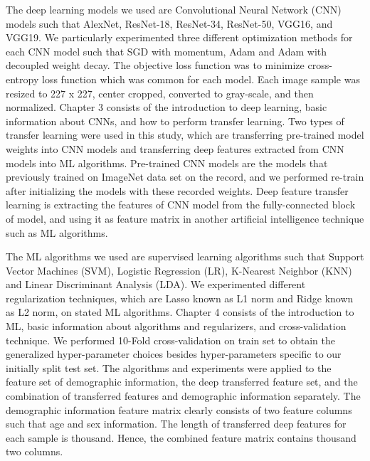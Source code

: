 The deep learning models we used are Convolutional Neural Network (CNN) models such that AlexNet, ResNet-18, ResNet-34, ResNet-50, VGG16, and VGG19. We particularly experimented three different optimization methods for each CNN model such that SGD with momentum, Adam and Adam with decoupled weight decay. The objective loss function was to minimize cross-entropy loss function which was common for each model. Each image sample was resized to 227 x 227, center cropped, converted to gray-scale, and then normalized. Chapter 3 consists of the introduction to deep learning, basic information about CNNs, and how to perform transfer learning. Two types of transfer learning were used in this study, which are transferring pre-trained model weights into CNN models and transferring deep features extracted from CNN models into ML algorithms. Pre-trained CNN models are the models that previously trained on ImageNet data set on the record, and we performed re-train after initializing the models with these recorded weights. Deep feature transfer learning is extracting the features of CNN model from the fully-connected block of model, and using it as feature matrix in another artificial intelligence technique such as ML algorithms.

The ML algorithms we used are supervised learning algorithms such that Support Vector Machines (SVM), Logistic Regression (LR), K-Nearest Neighbor (KNN) and Linear Discriminant Analysis (LDA). We experimented different regularization techniques, which are Lasso known as L1 norm and Ridge known as L2 norm, on stated ML algorithms. Chapter 4 consists of the introduction to ML, basic information about algorithms and regularizers, and cross-validation technique. We performed 10-Fold cross-validation on train set to obtain the generalized hyper-parameter choices besides hyper-parameters specific to our initially split test set. The algorithms and experiments were applied to the feature set of demographic information, the deep transferred feature set, and the combination of transferred features and demographic information separately. The demographic information feature matrix clearly consists of two feature columns such that age and sex information. The length of transferred deep features for each sample is thousand. Hence, the combined feature matrix contains  thousand two columns.

